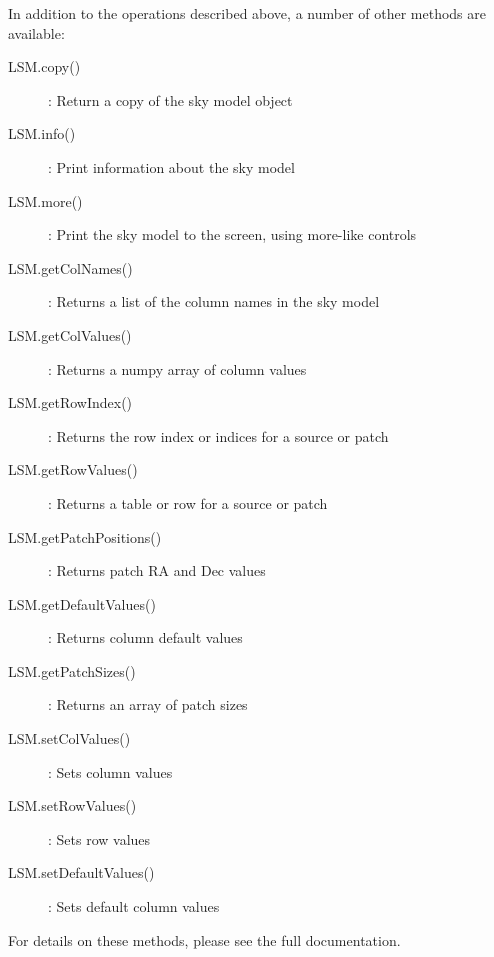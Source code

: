 \documentclass[structabstract]{article}
\begin{document}
In addition to the operations described above, a number of other methods are available:
\begin{description}
 \item[LSM.copy()]: Return a copy of the sky model object
 \item[LSM.info()]: Print information about the sky model
 \item[LSM.more()]: Print the sky model to the screen, using more-like controls
 \item[LSM.getColNames()]: Returns a list of the column names in the sky model
 \item[LSM.getColValues()]: Returns a numpy array of column values
 \item[LSM.getRowIndex()]: Returns the row index or indices for a source or patch
 \item[LSM.getRowValues()]: Returns a table or row for a source or patch
 \item[LSM.getPatchPositions()]: Returns patch RA and Dec values
 \item[LSM.getDefaultValues()]: Returns column default values
 \item[LSM.getPatchSizes()]: Returns an array of patch sizes
 \item[LSM.setColValues()]: Sets column values
 \item[LSM.setRowValues()]: Sets row values
 \item[LSM.setDefaultValues()]: Sets default column values
\end{description}
For details on these methods, please see the full documentation.
\end{document}
